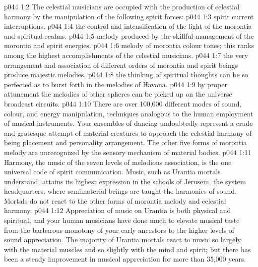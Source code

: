 \vs p044 1:2 The celestial musicians are occupied with the production of celestial harmony by the manipulation of the following spirit forces:
\vs p044 1:3 \bibnobreakspace {} spirit current interruptions.
\vs p044 1:4 \bibnobreakspace {} the control and intensification of the light of the morontia and spiritual realms.
\vs p044 1:5 \bibnobreakspace {} melody produced by the skillful management of the morontia and spirit energies.
\vs p044 1:6 \bibnobreakspace {} melody of morontia colour tones; this ranks among the highest accomplishments of the celestial musicians.
\vs p044 1:7 \bibnobreakspace {} the very arrangement and association of different orders of morontia and spirit beings produce majestic melodies.
\vs p044 1:8 \bibnobreakspace {} the thinking of spiritual thoughts can be so perfected as to burst forth in the melodies of Havona.
\vs p044 1:9 \bibnobreakspace {} by proper attunement the melodies of other spheres can be picked up on the universe broadcast circuits.
\vs p044 1:10 \pc There are over 100,000 different modes of sound, colour, and energy manipulation, techniques analogous to the human employment of musical instruments. Your ensembles of dancing undoubtedly represent a crude and grotesque attempt of material creatures to approach the celestial harmony of being placement and personality arrangement. The other five forms of morontia melody are unrecognized by the sensory mechanism of material bodies.
\vs p044 1:11 Harmony, the music of the seven levels of melodious association, is the one universal code of spirit communication. Music, such as Urantia mortals understand, attains its highest expression in the schools of Jerusem, the system headquarters, where semimaterial beings are taught the harmonies of sound. Mortals do not react to the other forms of morontia melody and celestial harmony.
\vs p044 1:12 \pc Appreciation of music on Urantia is both physical and spiritual; and your human musicians have done much to elevate musical taste from the barbarous monotony of your early ancestors to the higher levels of sound appreciation. The majority of Urantia mortals react to music so largely with the material muscles and so slightly with the mind and spirit; but there has been a steady improvement in musical appreciation for more than 35,000 years.
